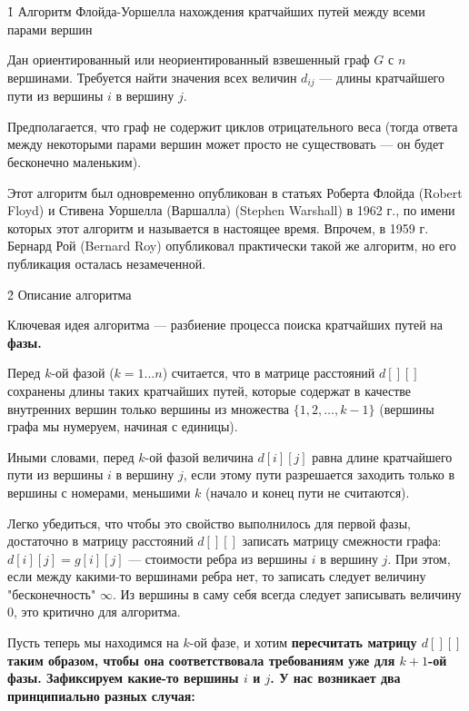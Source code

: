 \h1{ Алгоритм Флойда-Уоршелла нахождения кратчайших путей между всеми парами вершин }

Дан ориентированный или неориентированный взвешенный граф $G$ с $n$ вершинами. Требуется найти значения всех величин $d_{ij}$ --- длины кратчайшего пути из вершины $i$ в вершину $j$.

Предполагается, что граф не содержит циклов отрицательного веса (тогда ответа между некоторыми парами вершин может просто не существовать --- он будет бесконечно маленьким).

Этот алгоритм был одновременно опубликован в статьях Роберта Флойда (Robert Floyd) и Стивена Уоршелла (Варшалла) (Stephen Warshall) в 1962 г., по имени которых этот алгоритм и называется в настоящее время. Впрочем, в 1959 г. Бернард Рой (Bernard Roy) опубликовал практически такой же алгоритм, но его публикация осталась незамеченной.


\h2{ Описание алгоритма }

Ключевая идея алгоритма --- разбиение процесса поиска кратчайших путей на \bf{фазы}.

Перед $k$-ой фазой ($k = 1 \ldots n$) считается, что в матрице расстояний $d[][]$ сохранены длины таких кратчайших путей, которые содержат в качестве внутренних вершин только вершины из множества $\{ 1, 2, \ldots, k-1 \}$ (вершины графа мы нумеруем, начиная с единицы).

Иными словами, перед $k$-ой фазой величина $d[i][j]$ равна длине кратчайшего пути из вершины $i$ в вершину $j$, если этому пути разрешается заходить только в вершины с номерами, меньшими $k$ (начало и конец пути не считаются).

Легко убедиться, что чтобы это свойство выполнилось для первой фазы, достаточно в матрицу расстояний $d[][]$ записать матрицу смежности графа: $d[i][j] = g[i][j]$ --- стоимости ребра из вершины $i$ в вершину $j$. При этом, если между какими-то вершинами ребра нет, то записать следует величину "бесконечность" $\infty$. Из вершины в саму себя всегда следует записывать величину $0$, это критично для алгоритма.

Пусть теперь мы находимся на $k$-ой фазе, и хотим \bf{пересчитать} матрицу $d[][]$ таким образом, чтобы она соответствовала требованиям уже для $k+1$-ой фазы. Зафиксируем какие-то вершины $i$ и $j$. У нас возникает два принципиально разных случая:

